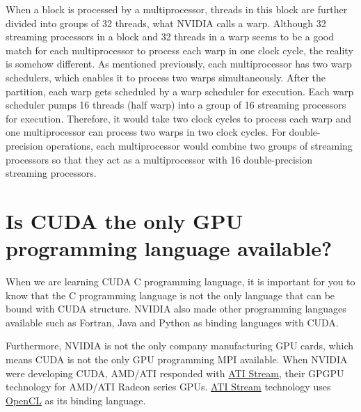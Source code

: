 \documentclass[letterpaper,10pt,openany,oneside]{sphinxmanual}
\begin{document}
When a block is processed by a multiprocessor, threads in this block are further divided into groups of 32 threads, what NVIDIA calls a warp. Although 32 streaming processors in a block and 32 threads in a warp seems to be a good match for each multiprocessor to process each warp in one clock cycle, the reality is somehow different. As mentioned previously, each multiprocessor has two warp schedulers, which enables it to process two warps simultaneously. After the partition, each warp gets scheduled by a warp scheduler for execution. Each warp scheduler pumps 16 threads (half warp) into a group of 16 streaming processors for execution. Therefore, it would take two clock cycles to process each warp and one multiprocessor can process two warps in two clock cycles. For double-precision operations, each multiprocessor would combine two groups of streaming processors so that they act as a multiprocessor with 16 double-precision streaming processors.


\section{Is CUDA the only GPU programming language available?}
\label{Introduction/Introduction:is-cuda-the-only-gpu-programming-language-available}
When we are learning CUDA C programming language, it is important for you to know that the C programming language is not the only language that can be bound with CUDA structure. NVIDIA also made other programming languages available such as Fortran, Java and Python as binding languages with CUDA.

Furthermore, NVIDIA is not the only company manufacturing GPU cards, which means CUDA is not the only GPU programming MPI available. When NVIDIA were developing CUDA, AMD/ATI responded with \href{http://www.amd.com/stream/}{ATI Stream}, their GPGPU technology for AMD/ATI Radeon series GPUs. \href{http://www.amd.com/stream/}{ATI Stream} technology uses \href{http://en.wikipedia.org/wiki/OpenCL}{OpenCL} as its binding language.
\end{document}
